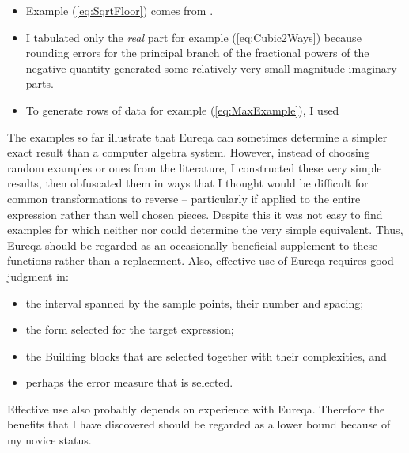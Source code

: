 \documentclass[12pt,english]{article}
\begin{document}
\vspace{-5pt}


\begin{itemize}
\item Example (\ref{eq:SqrtFloor}) comes from \cite{Concrete Mathematics}.\vspace{-5pt}

\item I tabulated only the \textsl{real} part for example (\ref{eq:Cubic2Ways})
because rounding errors for the principal branch of the fractional
powers of the negative quantity  generated
some relatively very small magnitude imaginary parts.\vspace{-5pt}

\item To generate  rows of data for example (\ref{eq:MaxExample}),
I used\vspace{-5pt}


\end{itemize}
The examples so far illustrate that Eureqa can sometimes determine
a simpler exact result than a computer algebra system. However, instead
of choosing random examples or ones from the literature, I constructed
these very simple results, then obfuscated them in ways that I thought
would be difficult for common transformations to reverse -- particularly
if applied to the entire expression rather than well chosen pieces.
Despite this it was not easy to find examples for which neither 
nor  could determine the very simple equivalent.
Thus, Eureqa should be regarded as an occasionally beneficial supplement
to these functions rather than a replacement. Also, effective use
of Eureqa requires good judgment in:\vspace{-5pt}

\begin{itemize}
\item the interval spanned by the sample points, their number and spacing;\vspace{-5pt}

\item the form selected for the target expression;\vspace{-5pt}

\item the Building blocks that are selected together with their complexities,
and\vspace{-5pt}

\item perhaps the error measure that is selected.\vspace{-5pt}

\end{itemize}
Effective use also probably depends on experience with Eureqa. Therefore
the benefits that I have discovered should be regarded as a lower
bound because of my novice status.
\end{document}
